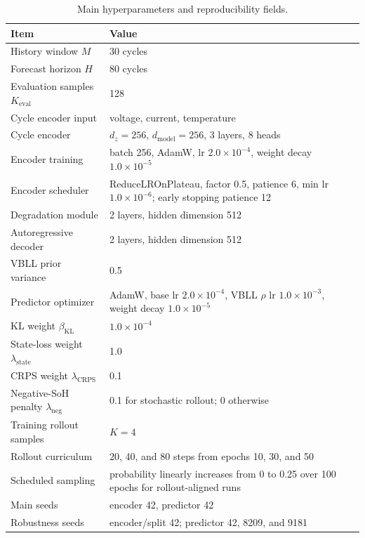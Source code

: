 \documentclass[conference]{IEEEtran}
\begin{document}
\begin{table}[h]
\centering
\scriptsize
\caption{Main hyperparameters and reproducibility fields.}
\label{tab:appendix-hparams}
\setlength{\tabcolsep}{2pt}
\begin{tabular}{@{}p{}p{}@{}}
\toprule
Item & Value \\
\midrule
History window $M$ & 30 cycles \\
Forecast horizon $H$ & 80 cycles \\
Evaluation samples $K_{\mathrm{eval}}$ & 128 \\
Cycle encoder input & voltage, current, temperature \\
Cycle encoder & $d_z=256$, $d_{\mathrm{model}}=256$, 3 layers, 8 heads \\
Encoder training & batch 256, AdamW, lr $2.0{\times}10^{-4}$, weight decay
$1.0{\times}10^{-5}$ \\
Encoder scheduler & ReduceLROnPlateau, factor 0.5, patience 6, min lr
$1.0{\times}10^{-6}$; early stopping patience 12 \\
Degradation module & 2 layers, hidden dimension 512 \\
Autoregressive decoder & 2 layers, hidden dimension 512 \\
VBLL prior variance & 0.5 \\
Predictor optimizer & AdamW, base lr $2.0{\times}10^{-4}$, VBLL $\rho$ lr
$1.0{\times}10^{-3}$, weight decay $1.0{\times}10^{-5}$ \\
KL weight $\beta_{\mathrm{KL}}$ & $1.0{\times}10^{-4}$ \\
State-loss weight $\lambda_{\mathrm{state}}$ & 1.0 \\
CRPS weight $\lambda_{\mathrm{CRPS}}$ & 0.1 \\
Negative-SoH penalty $\lambda_{\mathrm{neg}}$ & 0.1 for stochastic rollout;
0 otherwise \\
Training rollout samples & $K=4$ \\
Rollout curriculum & 20, 40, and 80 steps from epochs 10, 30, and 50 \\
Scheduled sampling & probability linearly increases from 0 to 0.25 over 100
epochs for rollout-aligned runs \\
Main seeds & encoder 42, predictor 42 \\
Robustness seeds & encoder/split 42; predictor 42, 8209, and 9181 \\
\bottomrule
\end{tabular}
\end{table}
\end{document}
